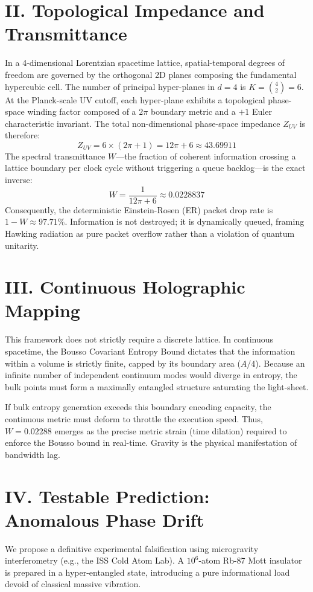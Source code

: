 \documentclass[twocolumn,prl,aps,superscriptaddress]{revtex4-2}
\begin{document}
\section{II. Topological Impedance and Transmittance}
In a 4-dimensional Lorentzian spacetime lattice, spatial-temporal degrees of freedom are governed by the orthogonal 2D planes composing the fundamental hypercubic cell. The number of principal hyper-planes in $d=4$ is $K = \binom{4}{2} = 6$. At the Planck-scale UV cutoff, each hyper-plane exhibits a topological phase-space winding factor composed of a $2\pi$ boundary metric and a $+1$ Euler characteristic invariant. The total non-dimensional phase-space impedance $Z_{UV}$ is therefore:
\begin{equation}
Z_{UV} = 6 \times (2\pi + 1) = 12\pi + 6 \approx 43.69911
\end{equation}
The spectral transmittance $W$---the fraction of coherent information crossing a lattice boundary per clock cycle without triggering a queue backlog---is the exact inverse:
\begin{equation}
W = \frac{1}{12\pi + 6} \approx 0.0228837
\end{equation}
Consequently, the deterministic Einstein-Rosen (ER) packet drop rate is $1 - W \approx 97.71\%$. Information is not destroyed; it is dynamically queued, framing Hawking radiation as pure packet overflow rather than a violation of quantum unitarity.

\section{III. Continuous Holographic Mapping}
This framework does not strictly require a discrete lattice. In continuous spacetime, the Bousso Covariant Entropy Bound dictates that the information within a volume is strictly finite, capped by its boundary area ($A/4$). Because an infinite number of independent continuum modes would diverge in entropy, the bulk points must form a maximally entangled structure saturating the light-sheet. 

If bulk entropy generation exceeds this boundary encoding capacity, the continuous metric must deform to throttle the execution speed. Thus, $W = 0.02288$ emerges as the precise metric strain (time dilation) required to enforce the Bousso bound in real-time. Gravity is the physical manifestation of bandwidth lag.

\section{IV. Testable Prediction: Anomalous Phase Drift}
We propose a definitive experimental falsification using microgravity interferometry (e.g., the ISS Cold Atom Lab). A $10^6$-atom Rb-87 Mott insulator is prepared in a hyper-entangled state, introducing a pure informational load devoid of classical massive vibration. 
\end{document}
